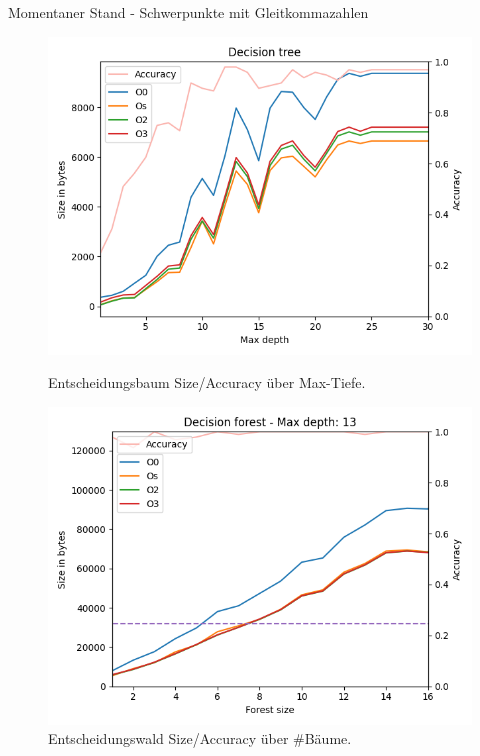 \documentclass[10pt]{beamer}
\begin{document}
\begin{frame}{Momentaner Stand - Schwerpunkte mit Gleitkommazahlen}
\begin{figure}
    \begin{minipage}[c]{0.4\linewidth}
        \includegraphics[width=\linewidth]{klisch_float_tree.png}
        \caption{Entscheidungsbaum Size/Accuracy über Max-Tiefe.}
    \end{minipage}
    \hfill
    \begin{minipage}[c]{0.4\linewidth}
        \includegraphics[width=\linewidth]{klisch_float_forest_13.png}
        \caption{Entscheidungswald Size/Accuracy über \#Bäume.}
    \end{minipage}%
\end{figure}

\end{frame}
\end{document}
